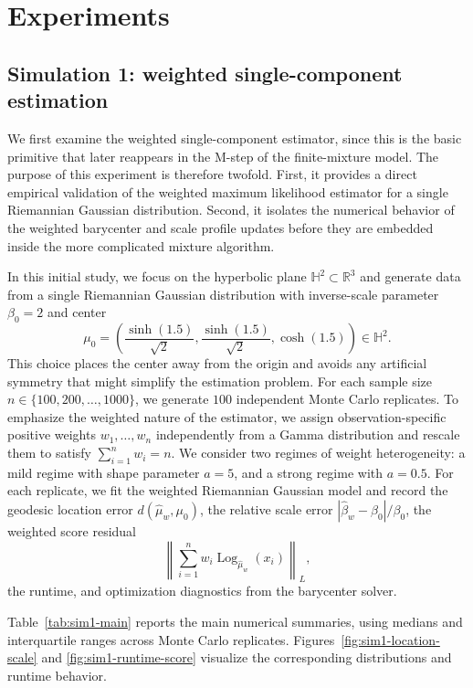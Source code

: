 \documentclass[11pt]{article}
\begin{document}
\section{Experiments}\label{sec:experiment}

\subsection{Simulation 1: weighted single-component estimation}\label{subsec:sim1}

We first examine the weighted single-component estimator, since this is the basic primitive that later reappears in the M-step of the finite-mixture model. The purpose of this experiment is therefore twofold. First, it provides a direct empirical validation of the weighted maximum likelihood estimator for a single Riemannian Gaussian distribution. Second, it isolates the numerical behavior of the weighted barycenter and scale profile updates before they are embedded inside the more complicated mixture algorithm.

In this initial study, we focus on the hyperbolic plane \(\mathbb{H}^2\subset\mathbb{R}^3\) and generate data from a single Riemannian Gaussian distribution with inverse-scale parameter \(\beta_0=2\) and center
\[
\mu_0=
\left(
\frac{\sinh(1.5)}{\sqrt{2}},
\frac{\sinh(1.5)}{\sqrt{2}},
\cosh(1.5)
\right)\in\mathbb{H}^2.
\]
This choice places the center away from the origin and avoids any artificial symmetry that might simplify the estimation problem. For each sample size $n \in \lbrace 100, 200, \ldots, 1000\rbrace$,  we generate \(100\) independent Monte Carlo replicates. To emphasize the weighted nature of the estimator, we assign observation-specific positive weights \(w_1,\ldots,w_n\) independently from a Gamma distribution and rescale them to satisfy \(\sum_{i=1}^n w_i=n\). We consider two regimes of weight heterogeneity: a mild regime with shape parameter \(a=5\), and a strong regime with \(a=0.5\). For each replicate, we fit the weighted Riemannian Gaussian model and record the geodesic location error \(d(\hat\mu_w,\mu_0)\), the relative scale error \(|\hat\beta_w-\beta_0|/\beta_0\), the weighted score residual
\[
\left\|
\sum_{i=1}^n w_i \operatorname{Log}_{\hat\mu_w}(x_i)
\right\|_L,
\]
the runtime, and optimization diagnostics from the barycenter solver.

Table~\ref{tab:sim1-main} reports the main numerical summaries, using medians and interquartile ranges across Monte Carlo replicates. Figures~\ref{fig:sim1-location-scale} and \ref{fig:sim1-runtime-score} visualize the corresponding distributions and runtime behavior.
\end{document}
